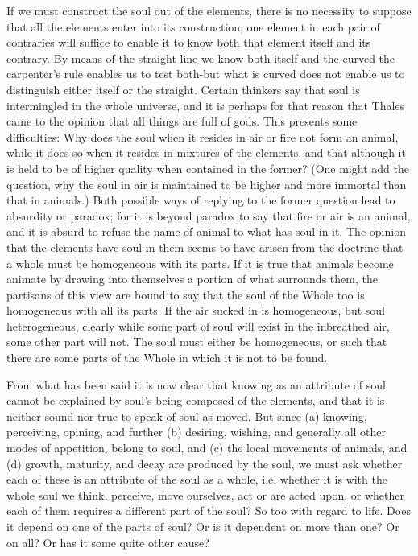 If we must construct the soul out of the elements, there is no necessity
to suppose that all the elements enter into its construction; one
element in each pair of contraries will suffice to enable it to know
both that element itself and its contrary. By means of the straight
line we know both itself and the curved-the carpenter's rule enables
us to test both-but what is curved does not enable us to distinguish
either itself or the straight. Certain thinkers say that soul is intermingled
in the whole universe, and it is perhaps for that reason that Thales
came to the opinion that all things are full of gods. This presents
some difficulties: Why does the soul when it resides in air or fire
not form an animal, while it does so when it resides in mixtures of
the elements, and that although it is held to be of higher quality
when contained in the former? (One might add the question, why the
soul in air is maintained to be higher and more immortal than that
in animals.) Both possible ways of replying to the former question
lead to absurdity or paradox; for it is beyond paradox to say that
fire or air is an animal, and it is absurd to refuse the name of animal
to what has soul in it. The opinion that the elements have soul in
them seems to have arisen from the doctrine that a whole must be homogeneous
with its parts. If it is true that animals become animate by drawing
into themselves a portion of what surrounds them, the partisans of
this view are bound to say that the soul of the Whole too is homogeneous
with all its parts. If the air sucked in is homogeneous, but soul
heterogeneous, clearly while some part of soul will exist in the inbreathed
air, some other part will not. The soul must either be homogeneous,
or such that there are some parts of the Whole in which it is not
to be found. 

From what has been said it is now clear that knowing as an attribute
of soul cannot be explained by soul's being composed of the elements,
and that it is neither sound nor true to speak of soul as moved. But
since (a) knowing, perceiving, opining, and further (b) desiring,
wishing, and generally all other modes of appetition, belong to soul,
and (c) the local movements of animals, and (d) growth, maturity,
and decay are produced by the soul, we must ask whether each of these
is an attribute of the soul as a whole, i.e. whether it is with the
whole soul we think, perceive, move ourselves, act or are acted upon,
or whether each of them requires a different part of the soul? So
too with regard to life. Does it depend on one of the parts of soul?
Or is it dependent on more than one? Or on all? Or has it some quite
other cause? 


